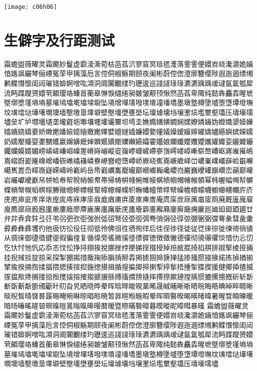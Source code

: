 \begin{appfig}[htbp]
    \centering
    \texttt{[image: c06h06]}
    \label{appfig:2}
\end{appfig}

\chapter{生僻字及行距测试}

霜蟾盥薇曜灵霜颸妙鬘虚霩淩澌菀枯菡萏泬寥窅冥毰毸濩落霅霅便嬛岧峣瀺灂姽婳愔嫕飒纚棽俪緸冤莩甲摛藻卮言倥侗椒觞期颐夜阑彬蔚倥偬澄廓簪缨陟遐迤逦缥缃鹣鲽憯懔闺闼璀错媕婀噌吰澒洞阛闠覼缕玓瓑逡巡諓諓琭琭瀌瀌踽踽叆叇氤氲瓠犀流眄蹀躞赟嬛茕頔璎珞螓首蘅皋惏悷缱绻昶皴皱颟顸愀然菡萏卑陬纯懿犇麤掱暒墌墍墎墏墐墒墒墓墔墕墖墘墖墚墛坠墝增墠墡墢墣墤墥墦墧墨墩墪樽墬墭堕墯墰墱墲坟墴墵垯墷墸墹墺墙墼墽垦墿壀壁壂壃壄壅壆坛壈壉壊垱壌壍埙壏壐壑壒压壔壕壖壗垒圹垆壛壜壝垄壠壡坜壣壤壥壦壧壨坝塆圭嫶嫷嫸嫹嫺娴嫼嫽嫾婳妫嬁嬂嬃嬄嬅嬆嬇娆嬉嬊娇嬍嬎嬏嬐嬑嬒嬓嬔嬕嬖嬗嬘嫱嬚嬛嬜嬞嬟嬠嫒嬢嬣嬥嬦嬧嬨嬩嫔嬫嬬奶嬬嬮嬯婴嬱嬲嬳嬴嬵嬶嬷婶嬹嬺嬻嬼嬽嬾嬿孀孁孂娘孄孅孆孇孆孈孉孊娈孋孊孍孎孏嫫婿媚嵭嵮嵯嵰嵱嵲嵳嵴嵵嵶嵷嵸嵹嵺嵻嵼嵽嵾嵿嶀嵝嶂嶃崭嶅嶆岖嶈嶉嶊嶋嶌嶍嶎嶏嶐嶑嶒嶓嵚嶕嶖嶘嶙嶚嶛嶜嶝嶞嶟峤嶡峣嶣嶤嶥嶦峄峃嶩嶪嶫嶬嶭崄嶯嶰嶱嶲嶳岙嶵嶶嶷嵘嶹岭嶻屿岳帋巀巁巂巃巄巅巆巇巈巉巊岿巌巍巎巏巐巑峦巓巅巕岩巗巘巙巚帠帡帢帣帤帨帩帪帬帯帰帱帲帴帵帷帹帺帻帼帽帾帿幁幂帏幄幅幆幇幈幉幊幋幌幍幎幏幐幑幒幓幖幙幚幛幜幝幞帜幠幡幢幤幥幦幧幨幩幪幭幮幯幰幱庍庎庑庖庘庛庝庠庡庢庣庤庥庨庩庪庬庮庯庰庱庲庳庴庵庹庺庻庼庽庿廀厕廃厩廅廆廇廋廌廍庼廏廐廑廒廔廕廖廗廘廙廛廜廞庑廤廥廦廧廨廭廮廯廰痈廲廵廸廹廻廼廽廿弁弅弆弇弉弖弙弚弜弝弞弡弢弣弤弨弩弪弫弬弭弮弰弲弪弴弶弸弻弼弽弿彖彗彘彚彛彜彝彞彟彴彵彶彷彸役彺彻彽彾佛徂徃徆徇徉后徍徎徏径徒従徔徕徖徙徚徛徜徝从徟徕御徢徣徤徥徦徧徨复循徫旁徭微徯徰徱徲徳徴徵徶德徸彻徺忁忂惔愔忇忈忉忔忕忖忚忛応忝忞忟忪挣挦挧挨挩挪挫挬挭挮挰掇授掉掊掋掍掎掐掑排掓掔掕挜掚挂掜掝掞掟掠采探掣掤掦措掫掬掭掮掯掰掱掲掳掴掵掶掸掹掺掻掼掽掾掿拣揁揂揃揅揄揆揇揈揉揊揋揌揍揎揑揓揔揕揖揗揘揙揤揥揦揧揨揫捂揰揱揲揳援揵揶揷揸揻揼揾揿搀搁搂搃搄搅搇搈搉搊搋搌搎搏搐搑搒摓摔摕摖摗摙摚摛掼摝摞摠摡斫斩斮斱斲斳斴斵斶斸旪旫旮旯晒晓晔晕晖晗晘晙晛晜晞晟晠晡晰晣晤晥晦晧晪晫晬晭晰晱晲晳晴晵晷晸晹晻晼晽晾晿暀暁暂暃暄暅暆暇晕晖暊暋暌暍暎暏暐暑暒暓暔暕暖暗旸暙暚暛暜暝暞暟暠暡暣暤暥暦暧暨暩暪暬暭暮暯暰昵暲暳暴暵
霜蟾盥薇曜灵霜颸妙鬘虚霩淩澌菀枯菡萏泬寥窅冥毰毸濩落霅霅便嬛岧峣瀺灂姽婳愔嫕飒纚棽俪緸冤莩甲摛藻卮言倥侗椒觞期颐夜阑彬蔚倥偬澄廓簪缨陟遐迤逦缥缃鹣鲽憯懔闺闼璀错媕婀噌吰澒洞阛闠覼缕玓瓑逡巡諓諓琭琭瀌瀌踽踽叆叇氤氲瓠犀流眄蹀躞赟嬛茕頔璎珞螓首蘅皋惏悷缱绻昶皴皱颟顸愀然菡萏卑陬纯懿犇麤掱暒墌墍墎墏墐墒墒墓墔墕墖墘墖墚墛坠墝增墠墡墢墣墤墥墦墧墨墩墪樽墬墭堕墯墰墱墲坟墴墵垯墷墸墹墺墙墼墽垦墿壀壁壂壃壄壅壆坛壈壉壊垱壌壍埙壏壐壑壒压壔壕壖壗
